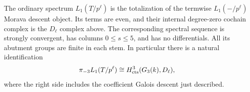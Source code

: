 \begin{lemma}\label{h3:des:finite-length-model}
The ordinary spectrum \(L_1(T/p^\ell)\) is the totalization
of the termwise \(L_1(-/p^\ell)\) Morava descent object.
Its terms are even, and their internal degree-zero
cochain complex is the \(D_\ell\) complex above.
The corresponding spectral sequence is strongly
convergent, has columns \(0\leq s\leq5\), and has
no differentials.  All its abutment groups are finite
in each stem.  In particular there is a natural
identification
\begin{equation}\label{h3:des:minus-three-edge}
 \pi_{-3}L_1(T/p^\ell)
       \cong H^3_{\mathrm{cts}}(G_3(k),D_\ell),
\end{equation}
where the right side includes the coefficient
Galois descent just described.
\end{lemma}

